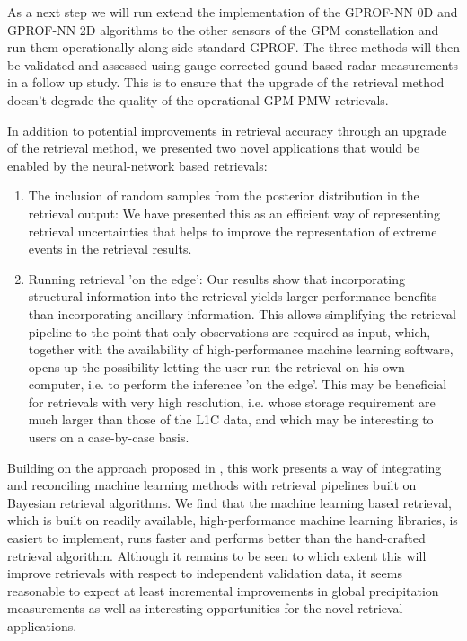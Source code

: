 \documentclass[a4paper,11pt,bibtotoc]{scrartcl}
\begin{document}
As a next step we will run extend the implementation of the GPROF-NN 0D and
GPROF-NN 2D algorithms to the other sensors of the GPM constellation and run
them operationally along side standard GPROF. The three methods will then
be validated and assessed using gauge-corrected gound-based radar measurements
in a follow up study. This is to ensure that the upgrade of the retrieval method
doesn't degrade the quality of the operational GPM PMW retrievals.

In addition to potential improvements in retrieval accuracy through an upgrade
of the retrieval method, we presented two novel applications that would be
enabled by the neural-network based retrievals:

\begin{enumerate}
\item The inclusion of random samples from the posterior distribution in the
  retrieval output: We have presented this as an efficient way of representing
  retrieval uncertainties that helps to improve the representation of extreme
  events in the retrieval results.
\item Running retrieval 'on the edge': Our results show that incorporating
  structural information into the retrieval yields larger performance benefits
  than incorporating ancillary information. This allows simplifying the
  retrieval pipeline to the point that only observations are required as input,
  which, together with the availability of high-performance machine learning
  software, opens up the possibility letting the user run the retrieval on his
  own computer, i.e. to perform the inference 'on the edge'. This may be
  beneficial for retrievals with very high resolution, i.e. whose storage
  requirement are much larger than those of the L1C data, and which may be
  interesting to users on a case-by-case basis.
\end{enumerate}

Building on the approach proposed in \citet{pfreundschuh18}, this work presents
a way of integrating and reconciling machine learning methods with retrieval
pipelines built on Bayesian retrieval algorithms. We find that the machine
learning based retrieval, which is built on readily available, high-performance
machine learning libraries, is easiert to implement, runs faster and performs
better than the hand-crafted retrieval algorithm. Although it remains to be seen
to which extent this will improve retrievals with respect to independent
validation data, it seems reasonable to expect at least incremental improvements
in global precipitation measurements as well as interesting opportunities for
the novel retrieval applications.




\end{document}
